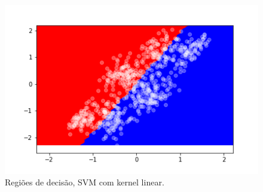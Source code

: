 \documentclass{article}
\begin{document}
    \begin{figure}[H]
        \centering
        \includegraphics[width=\linewidth]{svm_decision_linear.png}   
        \caption{Regiões de decisão, SVM com kernel linear.}
        \label{fig:svm_decision_linear}
    \end{figure}
    
\end{document}
